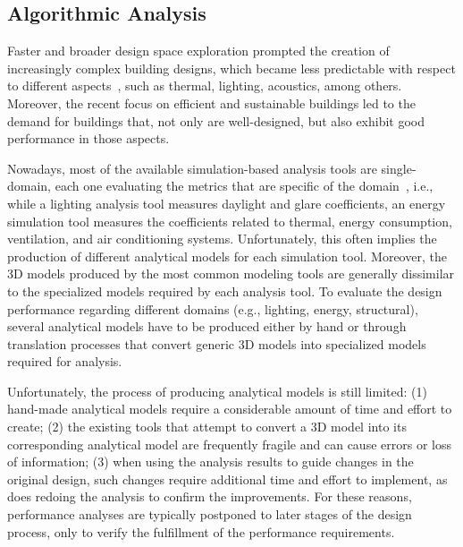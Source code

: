 \subsection{Algorithmic Analysis}
\label{ssec:aa}

Faster and broader design space exploration prompted the creation of increasingly complex building designs, which became less predictable with respect to different aspects~\cite{Branco2017AD}, such as thermal, lighting, acoustics, among others. Moreover, the recent focus on efficient and sustainable buildings led to the demand for buildings that, not only are well-designed, but also exhibit good performance in those aspects.
	
Nowadays, most of the available simulation-based analysis tools are single-domain, each one evaluating the metrics that are specific of the domain~\cite{Malkawi2005}, i.e., while a lighting analysis tool measures daylight and glare coefficients, an energy simulation tool measures the coefficients related to thermal, energy consumption, ventilation, and air conditioning systems. Unfortunately, this often implies the production of different analytical models for each simulation tool. Moreover, the 3D models produced by the most common modeling tools are generally dissimilar to the specialized models required by each analysis tool. To evaluate the design performance regarding different domains (e.g., lighting, energy, structural), several analytical models have to be produced either by hand or through translation processes that convert generic 3D models into specialized models required for analysis.

Unfortunately, the process of producing analytical models is still limited: (1) hand-made analytical models require a considerable amount of time and effort to create; (2) the existing tools that attempt to convert a 3D model into its corresponding analytical model are frequently fragile and can cause errors or loss of information; (3) when using the analysis results to guide changes in the original design, such changes require additional time and effort to implement, as does redoing the analysis to confirm the improvements. For these reasons, performance analyses are typically postponed to later stages of the design process, only to verify the fulfillment of the performance requirements.


